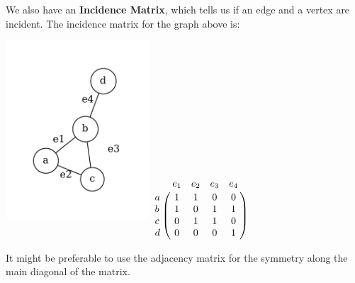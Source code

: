 We also have an \textbf{Incidence Matrix}, which tells us if an edge and a vertex are incident. The incidence matrix for the graph above is:
\begin{center}
    \includegraphics[width=0.4\textwidth]{Chapter1/mat.pdf} $\bordermatrix{~ & e_1 & e_2 & e_3 & e_4 \cr
                                                                           a & 1 & 1 & 0 & 0 \cr
                                                                           b & 1 & 0 & 1 & 1 \cr
                                                                           c & 0 & 1 & 1 & 0 \cr
                                                                           d & 0 & 0 & 0 & 1 }$
\end{center}
It might be preferable to use the adjacency matrix for the symmetry along the main diagonal of the matrix. 

% 
% 